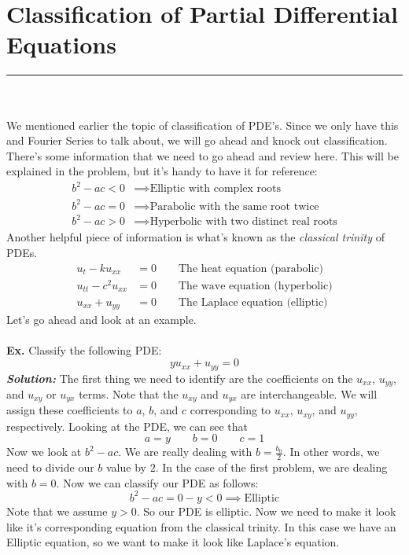 \documentclass{article}
\begin{document}
\section{Classification of Partial Differential Equations}
\hrule
\noindent\\\\
\indent We mentioned earlier the topic of classification of PDE's. Since we only
have this and Fourier Series to talk about, we will go ahead and knock out
classification. There's some information that we need to go ahead and review
here. This will be explained in the problem, but it's handy to have it for
reference:
\begin{align*}
b^{2} - ac < 0 &\implies \text{Elliptic with complex roots}\\
b^{2} - ac = 0 &\implies \text{Parabolic with the same root twice}\\
b^{2} - ac > 0 &\implies \text{Hyperbolic with two distinct real roots}
\end{align*}
\noindent Another helpful piece of information is what's known as the
\textit{classical trinity} of PDEs.
\begin{align*}
u_{t} - ku_{xx} &= 0 \qquad \text{The heat equation (parabolic)}\\
u_{tt} - c^{2}u_{xx} &= 0 \qquad \text{The wave equation (hyperbolic)}\\
u_{xx} + u_{yy} &= 0 \qquad \text{The Laplace equation (elliptic)}
\end{align*}
Let's go ahead and look at an example.\\\\
\indent \textbf{Ex. }Classify the following PDE:
\[yu_{xx} + u_{yy} = 0\]
\indent \textbf{\textit{Solution:}} The first thing we need to identify are the
coefficients on the $u_{xx}$, $u_{yy}$, and $u_{xy}$ or $u_{yx}$ terms. Note
that the $u_{xy}$ and $u_{yx}$ are interchangeable. We will assign these
coefficients to $a$, $b$, and $c$ corresponding to $u_{xx}$, $u_{xy}$, and
$u_{yy}$, respectively. Looking at the PDE, we can see that
\[
a = y \qquad b = 0 \qquad c = 1
\]
\noindent Now we look at $b^{2} - ac$. We are really dealing with
$b = \frac{b_{0}}{2}$. In other words, we need to divide our $b$ value by $2$.
In the case of the first problem, we are dealing with $b = 0$. Now we can
classify our PDE as follows:
\[
b^{2} - ac = 0 - y < 0 \implies \text{Elliptic}
\]
Note that we assume $y > 0$. So our PDE is elliptic. Now we need to make it look
like it's corresponding equation from the classical trinity. In this case we
have an Elliptic equation, so we want to make it look like Laplace's equation.
\end{document}
